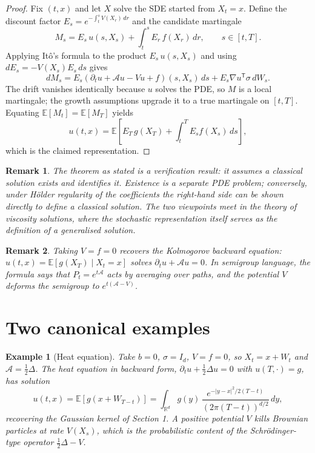 \documentclass{article}
\newtheorem{remark}{Remark}
\newtheorem{example}{Example}
\newcommand{\concept}[2]{#1}
\begin{document}
\begin{proof}
Fix $(t,x)$ and let $X$ solve the SDE started from $X_t = x$. Define the discount factor $E_s = e^{-\int_t^s V(X_r)\,dr}$ and the candidate martingale
\[
M_s = E_s\, u(s, X_s) + \int_t^s E_r\, f(X_r)\,dr, \qquad s \in [t, T].
\]
Applying \concept{It\^o's formula}{ito-formula} to the product $E_s\,u(s,X_s)$ and using $dE_s = -V(X_s) E_s\,ds$ gives
\[
dM_s = E_s \left( \partial_t u + \mathcal{A} u - V u + f \right)(s, X_s)\,ds + E_s \nabla u^{\mathsf{T}} \sigma\,dW_s.
\]
The drift vanishes identically because $u$ solves the PDE, so $M$ is a local martingale; the growth assumptions upgrade it to a true \concept{martingale}{martingale} on $[t,T]$. Equating $\mathbb{E}[M_t] = \mathbb{E}[M_T]$ yields
\[
u(t,x) = \mathbb{E}\left[ E_T\, g(X_T) + \int_t^T E_s f(X_s)\,ds \right],
\]
which is the claimed representation.
\end{proof}

\begin{remark}
The theorem as stated is a \emph{verification} result: it assumes a classical solution exists and identifies it. Existence is a separate PDE problem; conversely, under H\"older regularity of the coefficients the right-hand side can be shown directly to define a classical solution. The two viewpoints meet in the theory of viscosity solutions, where the stochastic representation itself serves as the definition of a generalised solution.
\end{remark}

\begin{remark}
Taking $V = f = 0$ recovers the Kolmogorov backward equation: $u(t,x) = \mathbb{E}[g(X_T) \mid X_t = x]$ solves $\partial_t u + \mathcal{A}u = 0$. In semigroup language, the formula says that $P_t = e^{t \mathcal{A}}$ acts by averaging over paths, and the potential $V$ deforms the semigroup to $e^{t(\mathcal{A} - V)}$.
\end{remark}

\section{Two canonical examples}

\begin{example}[Heat equation]
Take $b = 0$, $\sigma = I_d$, $V = f = 0$, so $X_t = x + W_t$ and $\mathcal{A} = \tfrac{1}{2}\Delta$. The \concept{heat equation}{heat-equation} in backward form, $\partial_t u + \tfrac{1}{2}\Delta u = 0$ with $u(T,\cdot) = g$, has solution
\[
u(t,x) = \mathbb{E}\left[ g(x + W_{T-t}) \right] = \int_{\mathbb{R}^d} g(y)\, \frac{e^{-|y-x|^2 / 2(T-t)}}{(2\pi (T-t))^{d/2}}\,dy,
\]
recovering the Gaussian kernel of Section 1. A positive potential $V$ kills Brownian particles at rate $V(X_s)$, which is the probabilistic content of the Schr\"odinger-type operator $\tfrac{1}{2}\Delta - V$.
\end{example}
\end{document}
